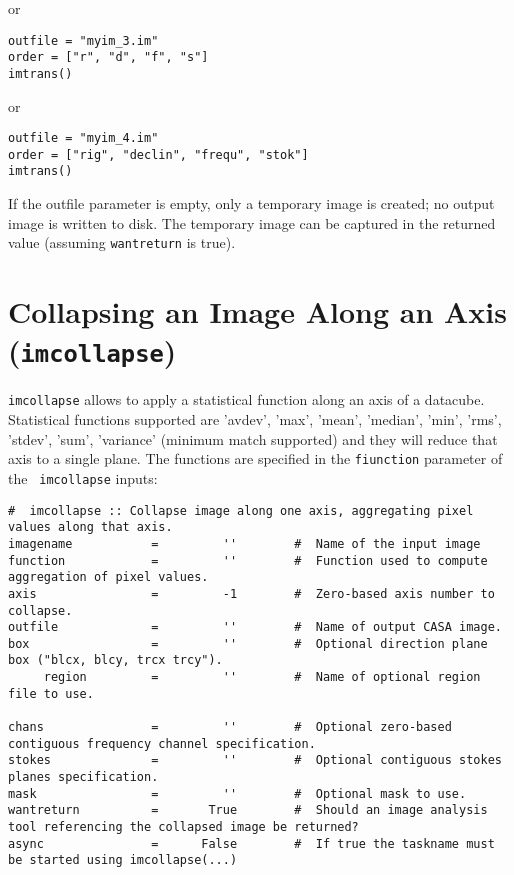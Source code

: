 or
\begin{verbatim}
outfile = "myim_3.im"
order = ["r", "d", "f", "s"]
imtrans()
\end{verbatim}

or

\begin{verbatim}
outfile = "myim_4.im"
order = ["rig", "declin", "frequ", "stok"]
imtrans()
\end{verbatim}



If the outfile parameter is empty, only a temporary image is created; no output image
is written to disk. The temporary image can be captured in the returned value (assuming
{\tt wantreturn} is true).

\section{Collapsing an Image Along an Axis ({\tt imcollapse})}
\label{section:analysis.imcollapse}

{\tt imcollapse} allows to apply a statistical function along an axis
of a datacube. Statistical functions supported are 'avdev', 'max',
'mean', 'median', 'min', 'rms', 'stdev', 'sum', 'variance' (minimum
match supported) and they will reduce that axis to a single plane. The
functions are specified in the {\tt fiunction} parameter of the {\tt
  imcollapse} inputs:

\small
\begin{verbatim}
#  imcollapse :: Collapse image along one axis, aggregating pixel values along that axis.
imagename           =         ''        #  Name of the input image
function            =         ''        #  Function used to compute aggregation of pixel values.
axis                =         -1        #  Zero-based axis number to collapse.
outfile             =         ''        #  Name of output CASA image.
box                 =         ''        #  Optional direction plane box ("blcx, blcy, trcx trcy").
     region         =         ''        #  Name of optional region file to use.

chans               =         ''        #  Optional zero-based contiguous frequency channel specification.
stokes              =         ''        #  Optional contiguous stokes planes specification.
mask                =         ''        #  Optional mask to use.
wantreturn          =       True        #  Should an image analysis tool referencing the collapsed image be returned?
async               =      False        #  If true the taskname must be started using imcollapse(...)
\end{verbatim}
\normalsize

